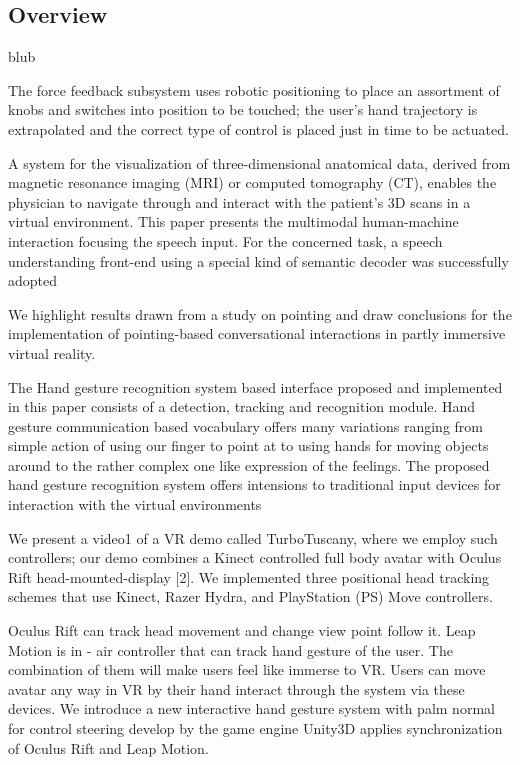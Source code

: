 
\subsection{Overview}

blub

The force feedback subsystem uses robotic positioning to place an assortment of knobs and switches into position to be touched; the user's hand trajectory is extrapolated and the correct type of control is placed just in time to be actuated.
\cite{Latham1997}

A system for the visualization of three-dimensional anatomical data, derived from magnetic resonance imaging (MRI) or computed tomography (CT), enables the physician to navigate through and interact with the patient's 3D scans in a virtual environment. This paper presents the multimodal human-machine interaction focusing the speech input. For the concerned task, a speech understanding front-end using a special kind of semantic decoder was successfully adopted
\cite{Muller1998}

We highlight results drawn from a study on pointing and draw conclusions for the implementation of pointing-based conversational interactions in partly immersive virtual reality.
\cite{Pfeiffer2008}

The Hand gesture recognition system based interface proposed and implemented in this paper consists of a detection, tracking and recognition module.
Hand gesture communication based vocabulary offers many variations ranging from simple action of using our finger to point at to using hands for moving objects around to the rather complex one like expression of the feelings. The proposed hand gesture recognition system offers intensions to traditional input devices for interaction with the virtual environments
\cite{Rautaray2011}

We present a video1 of a VR demo called TurboTuscany, where we employ such controllers; our demo combines a Kinect controlled full body avatar with Oculus Rift head-mounted-display [2]. We implemented three positional head tracking schemes that use Kinect, Razer Hydra, and PlayStation (PS) Move controllers.
\cite{Takala2014}

Oculus Rift can track head movement and change view point follow it. Leap Motion is in - air controller that can track hand gesture of the user. The combination of them will make users feel like immerse to VR. Users can move avatar any way in VR by their hand interact through the system via these devices. We introduce a new interactive hand gesture system with palm normal for control steering develop by the game engine Unity3D applies synchronization of Oculus Rift and Leap Motion.
\cite{Khundam2015a}

